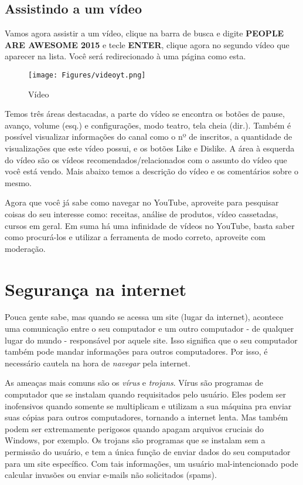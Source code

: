 \documentclass[hidelinks,12pt]{article}
\begin{document}
	\subsection{Assistindo a um vídeo}
	Vamos agora assistir a um vídeo, clique na barra de busca e digite \textbf{PEOPLE ARE AWESOME 2015} e tecle \textbf{ENTER}, clique agora no segundo vídeo que aparecer na lista.	Você será redirecionado à uma página como esta.
	\begin{figure}[!h]
		\centering
		\texttt{[image: Figures/videoyt.png]}
		\label{fig:config}
		\caption{Vídeo}
	\end{figure}
	
	Temos três áreas destacadas, a parte do vídeo se encontra os botões de pause, avanço, volume (esq.) e configurações, modo teatro, tela cheia (dir.).
	Também é possível visualizar informações do canal como o nº de inscritos, a quantidade de visualizações que este vídeo possui, e os botões Like e Dislike. A área à esquerda do vídeo são os vídeos recomendados/relacionados com o assunto do vídeo que você está vendo. Mais abaixo temos a descrição do vídeo e os comentários sobre o mesmo.
	
	Agora que você já sabe como navegar no YouTube, aproveite para pesquisar coisas do seu interesse como: receitas, análise de produtos, vídeo cassetadas, cursos em geral. Em suma há uma infinidade de vídeos no YouTube, basta saber como procurá-los e utilizar a ferramenta de modo correto, aproveite com moderação.
	

	\section{Segurança na internet}

	Pouca gente sabe, mas quando se acessa um site (lugar da internet), acontece uma comunicação entre o seu computador e um outro computador - de qualquer lugar do mundo - responsável por aquele site. Isso significa que o seu computador também pode mandar informações para outros computadores. Por isso, é necessário cautela na hora de \textit{navegar} pela internet.

	As ameaças mais comuns são os \textit{vírus} e \textit{trojans}. Vírus são programas de computador que se instalam quando requisitados pelo usuário. Eles podem ser inofensivos quando somente se multiplicam e utilizam a sua máquina pra enviar suas cópias para outros computadores, tornando a internet lenta. Mas também podem ser extremamente perigosos quando apagam arquivos cruciais do Windows, por exemplo. Os trojans são programas que se instalam sem a permissão do usuário, e tem a única função de enviar dados do seu computador para um site específico. Com tais informações, um usuário mal-intencionado pode calcular invasões ou enviar e-mails não solicitados (spams).
\end{document}
